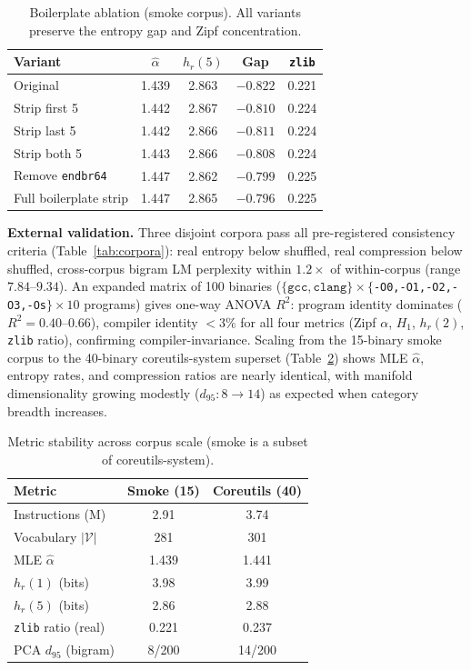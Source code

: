 \documentclass[conference]{IEEEtran}
\newcommand{\hr}[1]{h_r(#1)}
\newcommand{\zlib}{\texttt{zlib}}
\begin{document}
\begin{table}[t]
\centering
\caption{Boilerplate ablation (smoke corpus).  All variants preserve
         the entropy gap and Zipf concentration.}
\label{tab:ablation}
\begin{tabular}{@{}lcccc@{}}
\toprule
\textbf{Variant} & $\hat{\alpha}$ & $\hr{5}$ & \textbf{Gap} & \zlib{} \\
\midrule
Original                  & 1.439 & 2.863 & $-0.822$ & 0.221 \\
Strip first 5             & 1.442 & 2.867 & $-0.810$ & 0.224 \\
Strip last 5              & 1.442 & 2.866 & $-0.811$ & 0.224 \\
Strip both 5              & 1.443 & 2.866 & $-0.808$ & 0.224 \\
Remove \texttt{endbr64}   & 1.447 & 2.862 & $-0.799$ & 0.225 \\
Full boilerplate strip    & 1.447 & 2.865 & $-0.796$ & 0.225 \\
\bottomrule
\end{tabular}
\end{table}

\textbf{External validation.}
Three disjoint corpora pass all pre-registered consistency criteria
(Table~\ref{tab:corpora}): real entropy below shuffled, real compression
below shuffled, cross-corpus bigram LM perplexity within $1.2{\times}$ of
within-corpus (range $7.84$--$9.34$).
An expanded matrix of 100 binaries
($\{\mathtt{gcc},\mathtt{clang}\}{\times}\{$\texttt{-O0,-O1,-O2,-O3,-Os}$\}{\times}10$
programs) gives one-way ANOVA $R^2$: program identity dominates
($R^2{=}0.40$--$0.66$), compiler identity ${<}3\%$ for all four metrics
(Zipf $\alpha$, $H_1$, $\hr{2}$, \zlib{} ratio), confirming
compiler-invariance.  Scaling from the 15-binary smoke corpus to the
40-binary coreutils-system superset
(Table~\ref{tab:scaling}) shows MLE $\hat{\alpha}$, entropy rates,
and compression ratios are nearly identical, with manifold
dimensionality growing modestly ($d_{95}{:}8{\to}14$) as expected
when category breadth increases.

\begin{table}[t]
\centering
\caption{Metric stability across corpus scale (smoke is a subset of
         coreutils-system).}
\label{tab:scaling}
\begin{tabular}{@{}lcc@{}}
\toprule
\textbf{Metric} & \textbf{Smoke (15)} & \textbf{Coreutils (40)} \\
\midrule
Instructions (M)             & 2.91  & 3.74  \\
Vocabulary $|\mathcal{V}|$   & 281   & 301   \\
MLE $\hat{\alpha}$           & 1.439 & 1.441 \\
$\hr{1}$ (bits)              & 3.98  & 3.99  \\
$\hr{5}$ (bits)              & 2.86  & 2.88  \\
\zlib{} ratio (real)         & 0.221 & 0.237 \\
PCA $d_{95}$ (bigram)        & 8/200 & 14/200 \\
\bottomrule
\end{tabular}
\end{table}
\end{document}
